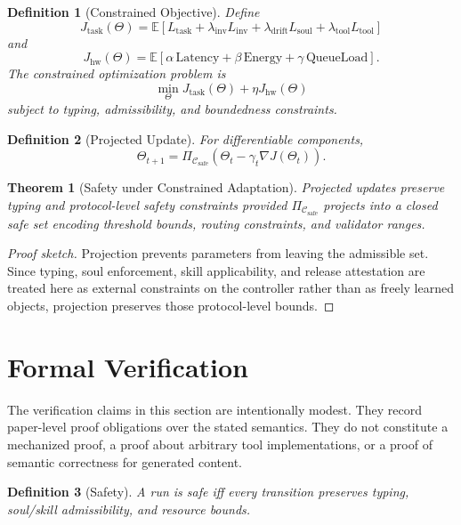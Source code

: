 \documentclass[11pt]{article}
\newtheorem{definition}{Definition}[section]
\newtheorem{theorem}{Theorem}[section]
\theoremstyle{remark}
\begin{document}
\begin{definition}[Constrained Objective]
Define
\[
J_{\mathrm{task}}(\Theta)=\mathbb{E}\!\left[L_{\mathrm{task}}+\lambda_{\mathrm{inv}}L_{\mathrm{inv}}+\lambda_{\mathrm{drift}}L_{\mathrm{soul}}+\lambda_{\mathrm{tool}}L_{\mathrm{tool}}\right]
\]
and
\[
J_{\mathrm{hw}}(\Theta)=\mathbb{E}\!\left[\alpha\,\mathrm{Latency}+\beta\,\mathrm{Energy}+\gamma\,\mathrm{QueueLoad}\right].
\]
The constrained optimization problem is
\[
\min_{\Theta} J_{\mathrm{task}}(\Theta)+\eta J_{\mathrm{hw}}(\Theta)
\]
subject to typing, admissibility, and boundedness constraints.
\end{definition}

\begin{definition}[Projected Update]
For differentiable components,
\[
\Theta_{t+1}=\Pi_{\mathcal{C}_{\mathrm{safe}}}\left(\Theta_t-\gamma_t \nabla J(\Theta_t)\right).
\]
\end{definition}

\begin{theorem}[Safety under Constrained Adaptation]
Projected updates preserve typing and protocol-level safety constraints provided \(\Pi_{\mathcal{C}_{\mathrm{safe}}}\) projects into a closed safe set encoding threshold bounds, routing constraints, and validator ranges.
\end{theorem}

\begin{proof}[Proof sketch]
Projection prevents parameters from leaving the admissible set. Since typing, soul enforcement, skill applicability, and release attestation are treated here as external constraints on the controller rather than as freely learned objects, projection preserves those protocol-level bounds.
\end{proof}

\section{Formal Verification}

The verification claims in this section are intentionally modest. They record paper-level proof obligations over the stated semantics. They do not constitute a mechanized proof, a proof about arbitrary tool implementations, or a proof of semantic correctness for generated content.

\begin{definition}[Safety]
A run is safe iff every transition preserves typing, soul/skill admissibility, and resource bounds.
\end{definition}
\end{document}
